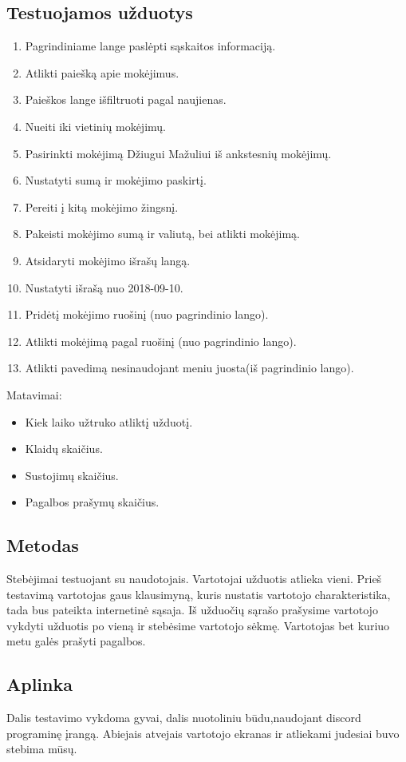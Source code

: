 \documentclass[oneside]{VUMIFPSkursinis}
\begin{document}
\subsection{Testuojamos užduotys}
\begin{enumerate}
	\item Pagrindiniame lange paslėpti sąskaitos informaciją.
	\item Atlikti paiešką apie mokėjimus.
	\item Paieškos lange išfiltruoti pagal naujienas.
	\item Nueiti iki vietinių mokėjimų.
	\item Pasirinkti mokėjimą Džiugui Mažuliui iš ankstesnių mokėjimų.
	\item Nustatyti sumą ir mokėjimo paskirtį.
	\item Pereiti į kitą mokėjimo žingsnį.
	\item Pakeisti mokėjimo sumą ir valiutą, bei atlikti mokėjimą.
	\item Atsidaryti mokėjimo išrašų langą.
	\item Nustatyti išrašą nuo 2018-09-10.
	\item Pridėtį mokėjimo ruošinį (nuo pagrindinio lango).
	\item Atlikti mokėjimą pagal ruošinį (nuo pagrindinio lango).
	\item Atlikti pavedimą nesinaudojant meniu juosta(iš pagrindinio lango).
\end{enumerate}
Matavimai:
\begin{itemize}
	\item Kiek laiko užtruko atliktį užduotį.
	\item Klaidų skaičius.
	\item Sustojimų skaičius.
	\item Pagalbos prašymų skaičius.
\end{itemize}
\subsection{Metodas}
Stebėjimai testuojant su naudotojais. Vartotojai užduotis atlieka vieni. Prieš testavimą vartotojas gaus klausimyną, kuris nustatis vartotojo charakteristika, tada bus pateikta internetinė sąsaja. Iš užduočių sąrašo prašysime vartotojo vykdyti užduotis po vieną ir stebėsime vartotojo sėkmę. Vartotojas bet kuriuo metu galės prašyti pagalbos. 
\subsection{Aplinka}
Dalis testavimo vykdoma gyvai, dalis nuotoliniu būdu,naudojant discord programinę įrangą. Abiejais atvejais vartotojo ekranas ir atliekami judesiai buvo stebima mūsų.
\end{document}
